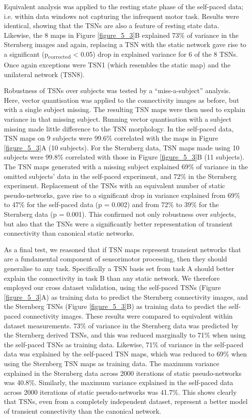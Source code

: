 Equivalent analysis was applied to the resting state phase of the self-paced data; i.e. within data windows not capturing the infrequent motor task. Results were identical, showing that the TSNs are also a feature of resting state data. Likewise, the 8 maps in Figure \ref{figure_5_3}B explained  73\% of variance in the Sternberg images and again, replacing a TSN with the static network gave rise to a significant (p\textsubscript{corrected} < 0.05) drop in explained variance for 6 of the 8 TSNs. Once again exceptions were TSN1 (which resembles the static map) and the unilateral network (TSN8). 

Robustness of TSNs over subjects was tested by a “miss-a-subject” analysis. Here, vector quantisation was applied to the connectivity images as before, but with a single subject missing. The resulting TSN maps were then used to explain variance in that missing subject. Running vector quantisation with a subject missing made little difference to the TSN morphology. In the self-paced data, TSN maps on 9 subjects were 99.6\% correlated with the maps in Figure \ref{figure_5_3}A (10 subjects). For the Sternberg data, TSN maps made using 10 subjects were  99.8\% correlated with those in Figure \ref{figure_5_3}B (11 subjects). The TSN maps generated with a missing subject explained  69\% of variance in the omitted subjects’ data in the self-paced experiment, and  72\% in the Sternberg experiment. Replacement of the TSNs with an equivalent number of static pseudo-networks, gave rise to a significant drop in variance explained from  69\% to  47\% for the self-paced data (p = 0.002) and from  72\% to  39\% for the Sternberg data (p = 0.001). This confirmed not only robustness over subjects, but also that the TSNs were a significantly better representation of transient connectivity than canonical static networks.

As a final test, we reasoned that if TSN maps represent transient networks that are a fundamental component of sensorimotor processing, then they should generalise to any task. Specifically a TSN basis set from task A should better explain the connectivity in task B than any static network. We therefore employed our cross dataset validation, using the self-paced TSNs (Figure \ref{figure_5_3}A) as training data to predict the Sternberg connectivity images, and the Sternberg TSNs (Figure \ref{figure_5_3}B) as training data to predict the self-paced connectivity images. These results were compared to equivalent within dataset measurements.  73\% of variance in the Sternberg data was predicted by the Sternberg derived TSNs, and this was reduced marginally to 71\% when using the self-paced TSNs as training data. Likewise, 71\% of variance in the self-paced data was explained by the self-paced TSN maps, which was reduced to  69\% when using the Sternberg TSN maps as training data. The maximum variance explained in the Sternberg data across 2000 iterations of static pseudo-networks was 40.8\%. Similarly, the maximum variance explained in the self-paced data across 2000 iterations of static pseudo-networks was 41.7\%. This shows clearly that TSNs, even from a completely independent dataset, represent a better model of transient connectivity than the canonical network. 

